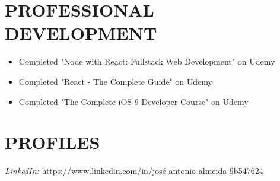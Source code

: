 \documentclass[margin, 10pt]{res} %
\begin{document}
\begin{resume}



\section{PROFESSIONAL \\ DEVELOPMENT} 

\begin{itemize}
\item Completed "Node with React: Fullstack Web Development" on Udemy
\end{itemize}

\begin{itemize}
\item Completed "React - The Complete Guide" on Udemy
\end{itemize}

\begin{itemize}
\item Completed "The Complete iOS 9 Developer Course" on Udemy
\end{itemize}


\section{PROFILES}

{\sl LinkedIn:} https://www.linkedin.com/in/josé-antonio-almeida-9b547624



\end{resume}
\end{document}

